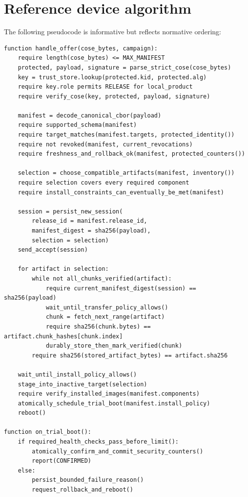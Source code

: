 \section{Reference device algorithm}

The following pseudocode is informative but reflects normative ordering:

\begin{lstlisting}[language={}]
function handle_offer(cose_bytes, campaign):
    require length(cose_bytes) <= MAX_MANIFEST
    protected, payload, signature = parse_strict_cose(cose_bytes)
    key = trust_store.lookup(protected.kid, protected.alg)
    require key.role permits RELEASE for local_product
    require verify_cose(key, protected, payload, signature)

    manifest = decode_canonical_cbor(payload)
    require supported_schema(manifest)
    require target_matches(manifest.targets, protected_identity())
    require not revoked(manifest, current_revocations)
    require freshness_and_rollback_ok(manifest, protected_counters())

    selection = choose_compatible_artifacts(manifest, inventory())
    require selection covers every required component
    require install_constraints_can_eventually_be_met(manifest)

    session = persist_new_session(
        release_id = manifest.release_id,
        manifest_digest = sha256(payload),
        selection = selection)
    send_accept(session)

    for artifact in selection:
        while not all_chunks_verified(artifact):
            require current_manifest_digest(session) == sha256(payload)
            wait_until_transfer_policy_allows()
            chunk = fetch_next_range(artifact)
            require sha256(chunk.bytes) == artifact.chunk_hashes[chunk.index]
            durably_store_then_mark_verified(chunk)
        require sha256(stored_artifact_bytes) == artifact.sha256

    wait_until_install_policy_allows()
    stage_into_inactive_target(selection)
    require verify_installed_images(manifest.components)
    atomically_schedule_trial_boot(manifest.install_policy)
    reboot()

function on_trial_boot():
    if required_health_checks_pass_before_limit():
        atomically_confirm_and_commit_security_counters()
        report(CONFIRMED)
    else:
        persist_bounded_failure_reason()
        request_rollback_and_reboot()
\end{lstlisting}

